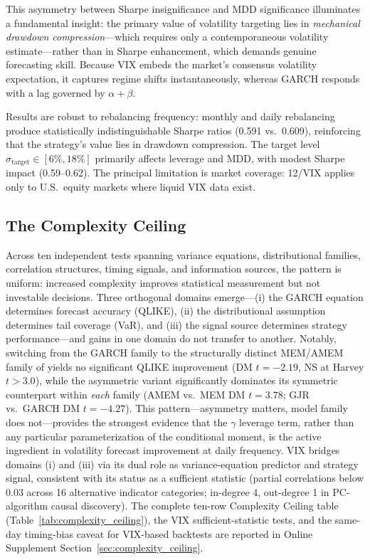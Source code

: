 This asymmetry between Sharpe insignificance and MDD significance illuminates a fundamental insight: the primary value of volatility targeting lies in \textit{mechanical drawdown compression}---which requires only a contemporaneous volatility estimate---rather than in Sharpe enhancement, which demands genuine forecasting skill. Because VIX embeds the market's consensus volatility expectation, it captures regime shifts instantaneously, whereas GARCH responds with a lag governed by $\alpha + \beta$.

Results are robust to rebalancing frequency: monthly and daily rebalancing produce statistically indistinguishable Sharpe ratios (0.591 vs.\ 0.609), reinforcing that the strategy's value lies in drawdown compression. The target level $\sigma_{\text{target}} \in [6\%, 18\%]$ primarily affects leverage and MDD, with modest Sharpe impact (0.59--0.62). The principal limitation is market coverage: 12/VIX applies only to U.S.\ equity markets where liquid VIX data exist.

\subsection{The Complexity Ceiling}
\label{sec:complexity_ceiling_body}

Across ten independent tests spanning variance equations, distributional families, correlation structures, timing signals, and information sources, the pattern is uniform: increased complexity improves statistical measurement but not investable decisions. Three orthogonal domains emerge---(i) the GARCH equation determines forecast accuracy (QLIKE), (ii) the distributional assumption determines tail coverage (VaR), and (iii) the signal source determines strategy performance---and gains in one domain do not transfer to another. Notably, switching from the GARCH family to the structurally distinct MEM/AMEM family of \citet{engle2006} yields no significant QLIKE improvement (DM $t = -2.19$, NS at Harvey $t > 3.0$), while the asymmetric variant significantly dominates its symmetric counterpart within \emph{each} family (AMEM vs.\ MEM DM $t = 3.78$; GJR vs.\ GARCH DM $t = -4.27$). This pattern---asymmetry matters, model family does not---provides the strongest evidence that the $\gamma$ leverage term, rather than any particular parameterization of the conditional moment, is the active ingredient in volatility forecast improvement at daily frequency. VIX bridges domains (i) and (iii) via its dual role as variance-equation predictor and strategy signal, consistent with its status as a sufficient statistic (partial correlations below 0.03 across 16 alternative indicator categories; in-degree 4, out-degree 1 in PC-algorithm causal discovery). The complete ten-row Complexity Ceiling table (Table~\ref{tab:complexity_ceiling}), the VIX sufficient-statistic tests, and the same-day timing-bias caveat for VIX-based backtests are reported in Online Supplement Section~\ref{sec:complexity_ceiling}.


